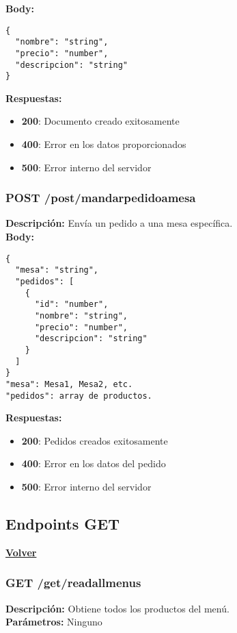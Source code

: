 \documentclass[12pt]{article}
\begin{document}
\textbf{Body:}
\begin{verbatim}
{
  "nombre": "string",
  "precio": "number",
  "descripcion": "string"
}
\end{verbatim}

\textbf{Respuestas:}
\begin{itemize}
    \item \textbf{200}: Documento creado exitosamente
    \item \textbf{400}: Error en los datos proporcionados
    \item \textbf{500}: Error interno del servidor
\end{itemize}

\subsubsection{POST /post/mandarpedidoamesa}
\textbf{Descripción:} Envía un pedido a una mesa específica.\\

\textbf{Body:}
\begin{verbatim}
{
  "mesa": "string",
  "pedidos": [
    {
      "id": "number",
      "nombre": "string",
      "precio": "number",
      "descripcion": "string"
    }
  ]
}
"mesa": Mesa1, Mesa2, etc.
"pedidos": array de productos.
\end{verbatim}

\textbf{Respuestas:}
\begin{itemize}
    \item \textbf{200}: Pedidos creados exitosamente
    \item \textbf{400}: Error en los datos del pedido
    \item \textbf{500}: Error interno del servidor
\end{itemize}

\clearpage

\subsection{Endpoints GET}
\hyperlink{anchor-indice}{\textbf{Volver}}\\

\subsubsection{GET /get/readallmenus}
\textbf{Descripción:} Obtiene todos los productos del menú.\\

\textbf{Parámetros:} Ninguno\\
\end{document}
